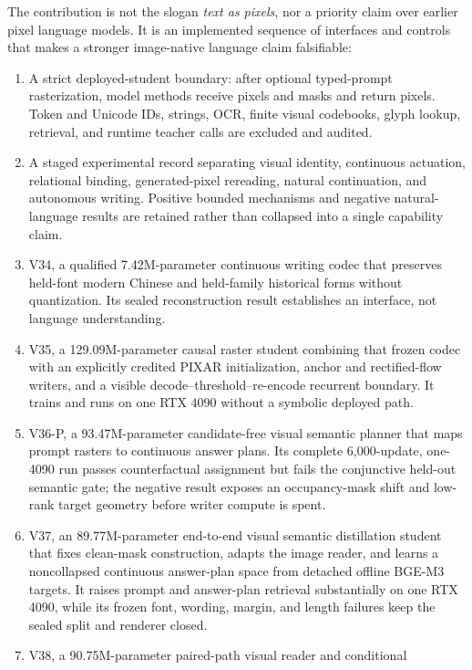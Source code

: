 \documentclass[11pt]{article}
\begin{document}
The contribution is not the slogan \emph{text as pixels}, nor a priority claim
over earlier pixel language models. It is an implemented sequence of interfaces
and controls that makes a stronger image-native language claim falsifiable:
\begin{enumerate}[leftmargin=*]
  \item A strict deployed-student boundary: after optional typed-prompt
  rasterization, model methods receive pixels and masks and return pixels.
  Token and Unicode IDs, strings, OCR, finite visual codebooks, glyph lookup,
  retrieval, and runtime teacher calls are excluded and audited.
  \item A staged experimental record separating visual identity, continuous
  actuation, relational binding, generated-pixel rereading, natural
  continuation, and autonomous writing. Positive bounded mechanisms and
  negative natural-language results are retained rather than collapsed into a
  single capability claim.
  \item V34, a qualified 7.42M-parameter continuous writing codec that preserves
  held-font modern Chinese and held-family historical forms without
  quantization. Its sealed reconstruction result establishes an interface, not
  language understanding.
  \item V35, a 129.09M-parameter causal raster student combining that frozen
  codec with an explicitly credited PIXAR initialization, anchor and
  rectified-flow writers, and a visible decode--threshold--re-encode recurrent
  boundary. It trains and runs on one RTX 4090 without a symbolic deployed
  path.
  \item V36-P, a 93.47M-parameter candidate-free visual semantic planner that
  maps prompt rasters to continuous answer plans. Its complete 6,000-update,
  one-4090 run passes counterfactual assignment but fails the conjunctive
  held-out semantic gate; the negative result exposes an occupancy-mask shift
  and low-rank target geometry before writer compute is spent.
  \item V37, an 89.77M-parameter end-to-end visual semantic distillation
  student that fixes clean-mask construction, adapts the image reader, and
  learns a noncollapsed continuous answer-plan space from detached offline
  BGE-M3 targets. It raises prompt and answer-plan retrieval substantially on
  one RTX 4090, while its frozen font, wording, margin, and length failures
  keep the sealed split and renderer closed.
  \item V38, a 90.75M-parameter paired-path visual reader and conditional

\end{enumerate}
\end{document}
